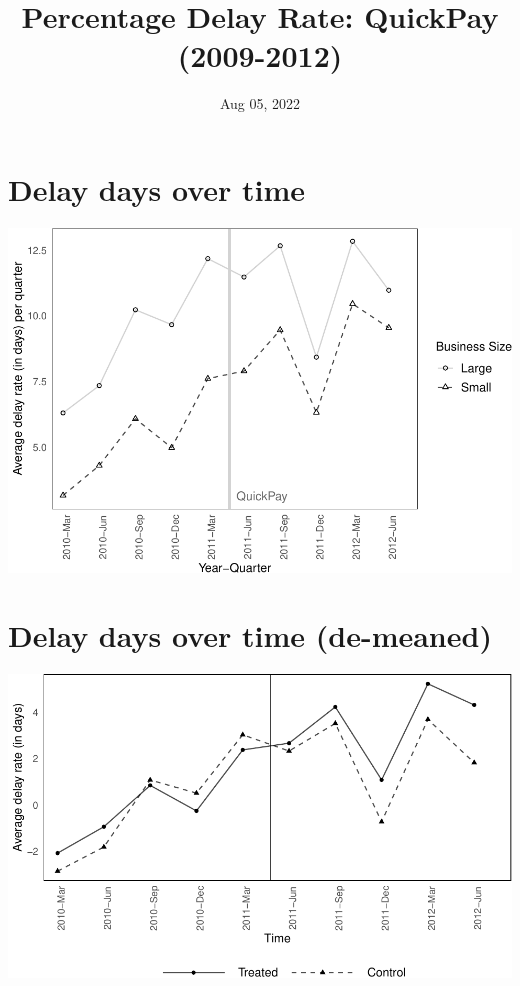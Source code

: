 \documentclass[
]{article}
\title{Percentage Delay Rate: QuickPay (2009-2012)}
\author{}
\date{\vspace{-2.5em}Aug 05, 2022}
\begin{document}
\maketitle

\hypertarget{delay-days-over-time}{%
\section{Delay days over time}\label{delay-days-over-time}}

\includegraphics{qp_first_pc_delay-2_files/figure-latex/plot_delay_days-1.pdf}

\hypertarget{delay-days-over-time-de-meaned}{%
\section{Delay days over time
(de-meaned)}\label{delay-days-over-time-de-meaned}}

\includegraphics{qp_first_pc_delay-2_files/figure-latex/demeaned_plot_delay_days-1.pdf}
\end{document}
